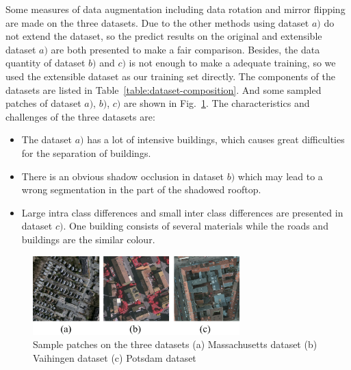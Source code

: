 Some measures of data augmentation including data rotation and mirror flipping are made on the three datasets.
Due to the other methods using dataset ${a)}$ do not extend the dataset, so the predict results on the original and extensible dataset $a)$ are both presented to make a fair comparison.
Besides, the data quantity of dataset ${b)}$ and ${c)}$ is not enough to make a adequate training, so we used the extensible dataset as our training set directly.
The components of the datasets are listed in Table~\ref{table:dataset-composition}.
And some sampled patches of dataset ${a)}$, ${b)}$, ${c)}$ are shown in Fig.~\ref{fig:dataset_sample}.
The characteristics and challenges of the three datasets are:
\begin{itemize}
 \item The dataset ${a)}$ has a lot of intensive buildings, which causes great difficulties for the separation of buildings.
 \item There is an obvious shadow occlusion in dataset ${b)}$ which may lead to a wrong segmentation in the part of the shadowed rooftop.
 \item Large intra class differences and small inter class differences are presented in dataset ${c)}$. One building consists of several materials while the roads and buildings are the similar colour. 
\end{itemize}


\begin{figure}
\centering
\includegraphics[width=8cm]{Figures/datasets.eps}
\caption{Sample patches on the three datasets  (a) Massachusetts dataset (b) Vaihingen dataset (c) Potsdam dataset}
\label{fig:dataset_sample}
\end{figure}

